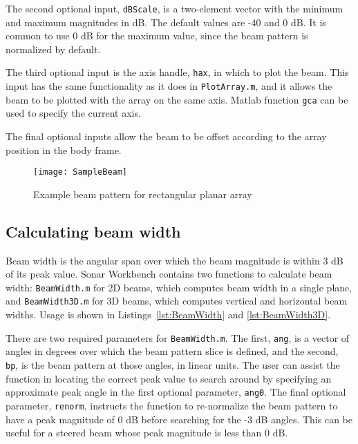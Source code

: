 The second optional input, \texttt{dBScale}, is a two-element vector with the minimum and maximum magnitudes in dB. The default values are -40 and 0 dB. It is common to use 0 dB for the maximum value, since the beam pattern is normalized by default.

The third optional input is the axis handle, \texttt{hax}, in which to plot the beam. This input has the same functionality as it does in \texttt{PlotArray.m}, and it allows the beam to be plotted with the array on the same axis. Matlab function \texttt{gca} can be used to specify the current axis.

The final optional inputs allow the beam to be offset according to the array position in the body frame. 



\clearpage
\begin{sidewaysfigure}[!ht]
\begin{center}
\texttt{[image: SampleBeam]}
\caption{\label{fig:SampleBeam}Example beam pattern for rectangular planar array}
\end{center}
\end{sidewaysfigure}

\clearpage
\subsection{Calculating beam width}

Beam width is the angular span over which the beam magnitude is within 3 dB of its peak value. Sonar Workbench contains two functions to calculate beam width: \texttt{BeamWidth.m} for 2D beams, which computes beam width in a single plane, and \texttt{BeamWidth3D.m} for 3D beams, which computes vertical and horizontal beam widths. Usage is shown in Listings~\ref{lst:BeamWidth} and \ref{lst:BeamWidth3D}.





There are two required parameters for \texttt{BeamWidth.m}. The first, \texttt{ang}, is a vector of angles in degrees over which the beam pattern slice is defined, and the second, \texttt{bp}, is the beam pattern at those angles, in linear units. The user can assist the function in locating the correct peak value to search around by specifying an approximate peak angle in the first optional parameter, \texttt{ang0}. The final optional parameter, \texttt{renorm}, instructs the function to re-normalize the beam pattern to have a peak magnitude of 0 dB before searching for the -3 dB angles. This can be useful for a steered beam whose peak magnitude is less than 0 dB. 

